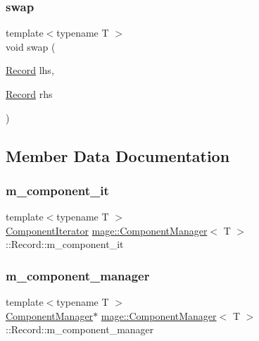 \subsubsection{\texorpdfstring{swap}{swap}}
{\footnotesize\ttfamily template$<$typename T $>$ \\
void swap (\begin{DoxyParamCaption}\item[{\mbox{\hyperlink{classmage_1_1_component_manager_1_1_record}{Record}}}]{lhs,  }\item[{\mbox{\hyperlink{classmage_1_1_component_manager_1_1_record}{Record}}}]{rhs }\end{DoxyParamCaption})\hspace{0.3cm}{\ttfamily [friend]}}



\subsection{Member Data Documentation}
\mbox{\label{classmage_1_1_component_manager_1_1_record_ab4826196f0aa79a8544e07165102d27c}} 
\subsubsection{\texorpdfstring{m\+\_\+component\+\_\+it}{m\_component\_it}}
{\footnotesize\ttfamily template$<$typename T $>$ \\
\mbox{\hyperlink{classmage_1_1_component_manager_1_1_record_ac9f303d103be56826be484204f17c249}{Component\+Iterator}} \mbox{\hyperlink{classmage_1_1_component_manager}{mage\+::\+Component\+Manager}}$<$ T $>$\+::Record\+::m\+\_\+component\+\_\+it\hspace{0.3cm}{\ttfamily [private]}}

\mbox{\label{classmage_1_1_component_manager_1_1_record_aeb161047c020be30cc0418e882ab9816}} 
\subsubsection{\texorpdfstring{m\+\_\+component\+\_\+manager}{m\_component\_manager}}
{\footnotesize\ttfamily template$<$typename T $>$ \\
\mbox{\hyperlink{classmage_1_1_component_manager}{Component\+Manager}}$\ast$ \mbox{\hyperlink{classmage_1_1_component_manager}{mage\+::\+Component\+Manager}}$<$ T $>$\+::Record\+::m\+\_\+component\+\_\+manager\hspace{0.3cm}{\ttfamily [private]}}

